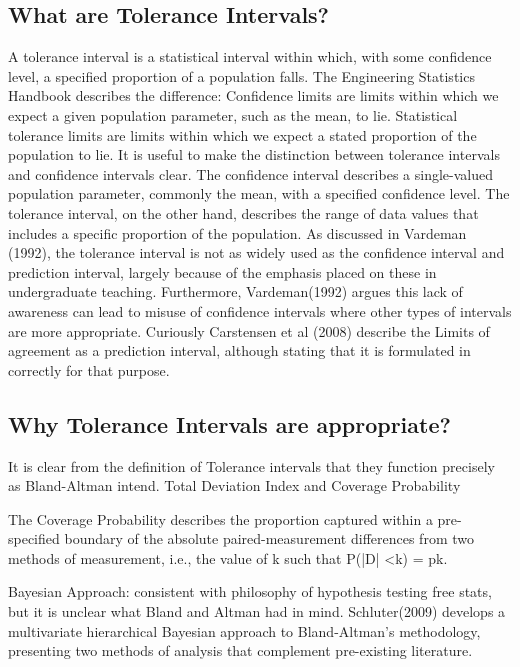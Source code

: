 \subsection*{What are Tolerance Intervals?}
A tolerance interval is a statistical interval within which, with some confidence level, a specified proportion of a population falls.
The Engineering Statistics Handbook describes the difference: Confidence limits are limits within which we expect a given population parameter, such as the mean, to lie. Statistical tolerance limits are limits within which we expect a stated proportion of the population to lie.
It is useful to make the distinction between tolerance intervals and confidence intervals clear. The confidence interval describes a single-valued population parameter, commonly the mean, with a specified confidence level. The tolerance interval, on the other hand, describes the range of data values that includes a specific proportion of the population.
As discussed in Vardeman (1992), the tolerance interval is not as widely used as the confidence interval and prediction interval, largely because of the emphasis placed on these in undergraduate teaching. Furthermore, Vardeman(1992) argues this lack of awareness can lead to misuse of confidence intervals where other types of intervals are more appropriate.
Curiously Carstensen et al (2008) describe the Limits of agreement as a prediction interval, although stating that it is formulated in correctly for that purpose.

\subsection*{Why Tolerance Intervals are appropriate?}
It is clear from the definition of Tolerance intervals that they function precisely as Bland-Altman intend.
Total Deviation Index and Coverage Probability

The Coverage Probability describes the proportion captured within a pre-specified boundary of the absolute paired-measurement differences from two methods of measurement, i.e., the value of k such that P(|D| <k) = pk.

Bayesian Approach: 
consistent with philosophy of hypothesis testing free stats, but it is unclear what Bland and Altman had in mind.
Schluter(2009) develops a multivariate hierarchical Bayesian approach to Bland-Altman’s methodology, presenting two methods of analysis that complement pre-existing literature. 


\newpage

